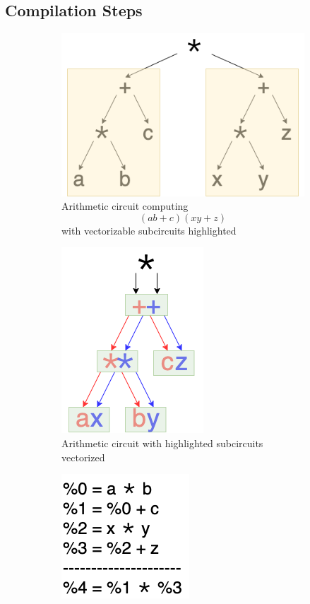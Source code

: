 \subsection*{Compilation Steps}
\begin{figure}
    \begin{subfigure}{0.45\columnwidth}
        \includegraphics[scale=0.25]{figures/compilation_overview/small_expression_circuit.drawio.png}
        \caption{Arithmetic circuit computing $$(ab+c)(xy+z)$$ with vectorizable subcircuits highlighted}
        \label{fig:small-expr-circuit}
    \end{subfigure}
    \begin{subfigure}{0.45\columnwidth}
        \includegraphics[scale=0.4]{figures/compilation_overview/stacked_vector_circuit.drawio.png}
        \caption{Arithmetic circuit with highlighted subcircuits vectorized}
        \label{fig:partially-vectorized-circuit}
    \end{subfigure}
    \begin{subfigure}{0.3\columnwidth}
        \includegraphics[scale=0.3]{figures/compilation_overview/code_split_into_phases.drawio.png}

\end{subfigure}
\end{figure}

